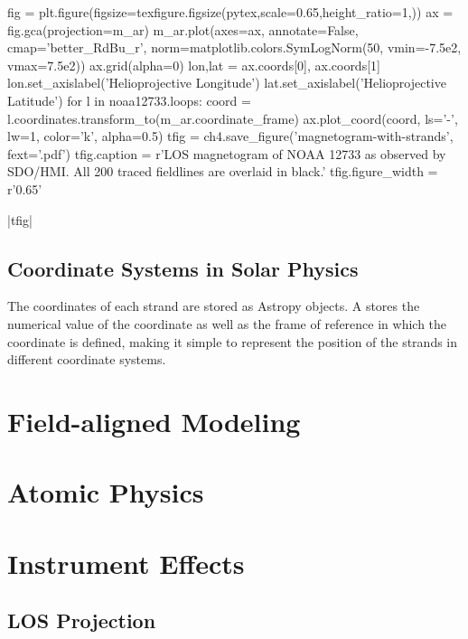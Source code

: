 \begin{pycode}[chapter4]
fig = plt.figure(figsize=texfigure.figsize(pytex,scale=0.65,height_ratio=1,))
ax = fig.gca(projection=m_ar)
m_ar.plot(axes=ax, annotate=False, cmap='better_RdBu_r',
          norm=matplotlib.colors.SymLogNorm(50, vmin=-7.5e2, vmax=7.5e2))
ax.grid(alpha=0)
lon,lat = ax.coords[0], ax.coords[1]
lon.set_axislabel('Helioprojective Longitude')
lat.set_axislabel('Helioprojective Latitude')
for l in noaa12733.loops:
    coord = l.coordinates.transform_to(m_ar.coordinate_frame)
    ax.plot_coord(coord, ls='-', lw=1, color='k', alpha=0.5)
tfig = ch4.save_figure('magnetogram-with-strands', fext='.pdf')
tfig.caption = r'LOS magnetogram of NOAA 12733 as observed by SDO/HMI. All 200 traced fieldlines are overlaid in black.'
tfig.figure_width = r'0.65\textwidth'
\end{pycode}
\py[chapter4]|tfig|

\subsection{Coordinate Systems in Solar Physics}\label{sec:coordinates}

The coordinates of each strand are stored as Astropy  objects. A  stores the numerical value of the coordinate as well as the frame of reference in which the coordinate is defined, making it simple to represent the position of the strands in different coordinate systems.

\section{Field-aligned Modeling}


\section{Atomic Physics}


\section{Instrument Effects}

\subsection{LOS Projection}
